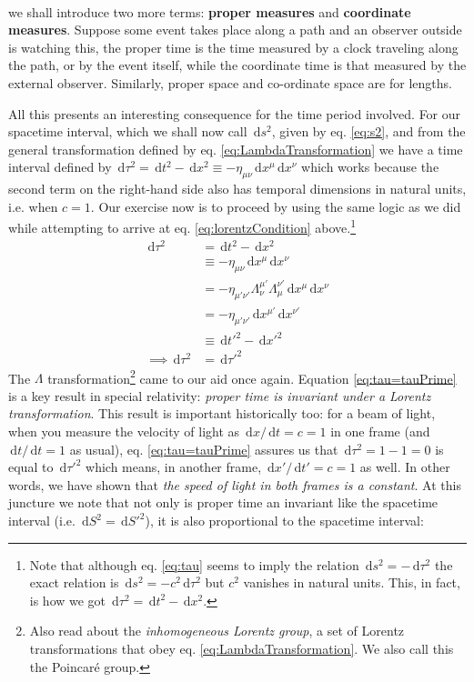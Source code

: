 \documentclass[english,seminar]{lecture}
\newcommand{\diff}{\,\textrm{d}}
\begin{document}
\\ we shall introduce two more terms: \textbf{proper measures} and \textbf{coordinate measures}. Suppose some event takes place along a path and an observer outside is watching this, the proper time is the time measured by a clock traveling along the path, or by the event itself, while the coordinate time is that measured by the external observer. Similarly, proper space and co-ordinate space are for lengths.

All this presents an interesting consequence for the time period involved. For our spacetime interval, which we shall now call $\diff s^2$, given by eq. \eqref{eq:s2}, and from the general transformation defined by eq. \eqref{eq:LambdaTransformation} we have a time interval defined by $\diff \tau^2 = \diff t^2 - \diff x^2 \equiv -\eta_{\mu\nu}\diff x^\mu \diff x^\nu$ which works because the second term on the right-hand side also has temporal dimensions in natural units, i.e. when $c=1$. Our exercise now is to proceed by using the same logic as we did while attempting to arrive at eq. \eqref{eq:lorentzCondition} above.\footnote{Note that although eq. \eqref{eq:tau} seems to imply the relation $\diff s^2 = - \diff \tau^2$ the exact relation is $\diff s^2 = -c^2 \diff \tau^2$ but $c^2$ vanishes in natural units. This, in fact, is how we got $\diff \tau^2 = \diff t^2 - \diff x^2$.}
\begin{align}
	\diff \tau^2 &= \diff t^2 - \diff x^2 \label{eq:tau} \\
				&\equiv -\eta_{\mu\nu}\diff x^\mu \diff x^\nu \nonumber\\
				&= -\eta_{\mu '\nu '} \Lambda^{\mu '}_{\nu} \Lambda^{\nu '}_{\mu} \diff x^{\mu} \diff x^{\nu} \nonumber\\
				&= -\eta_{\mu ' \nu '} \diff x^{\mu '} \diff x^{\nu '} \nonumber\\
				&\equiv \diff t'^2 - \diff x'^2 \nonumber\\
\implies \diff \tau^2 &= \diff \tau '^{2} \label{eq:tau=tauPrime}
\end{align}%
The $\Lambda$ transformation\footnote{Also read about the \textit{inhomogeneous Lorentz group}, a set of Lorentz transformations that obey eq. \eqref{eq:LambdaTransformation}.  We also call this the Poincar\'{e} group.} came to our aid once again. Equation \eqref{eq:tau=tauPrime} is a key result in special relativity: \textit{proper time is invariant under a Lorentz transformation}. This result is important historically too: for a beam of light, when you measure the velocity of light as $\diff x/\diff t = c = 1$ in one frame (and $\diff t/\diff t = 1$ as usual), eq. \eqref{eq:tau=tauPrime} assures us that $\diff \tau^2 = 1 - 1 = 0$ is equal to $\diff \tau'^2$ which means, in another frame, $\diff x'/\diff t' = c = 1$ as well. In other words, we have shown that \textit{the speed of light in both frames is a constant}. At this juncture we note that not only is proper time an invariant like the spacetime interval (i.e. $\diff S^2 = \diff S'^2$), it is also proportional to the spacetime interval:
\end{document}
